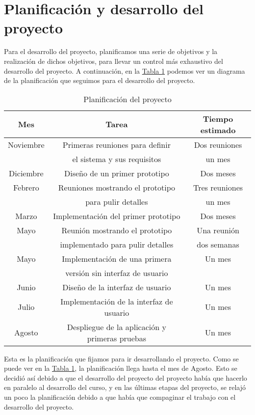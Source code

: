 \section{Planificación y desarrollo del proyecto}

Para el desarrollo del proyecto, planificamos una serie de objetivos y la realización de dichos objetivos, para llevar un control más exhaustivo del desarrollo del proyecto. A continuación, en la \hyperref[desarrollo]{Tabla \ref*{desarrollo}} podemos ver un diagrama de la planificación que seguimos para el desarrollo del proyecto.
\begin{table}[H]
\begin{center}
\begin{tabular}{c | c | c}
\textbf{Mes} & \textbf{Tarea} & \textbf{Tiempo estimado} \\
\hline
Noviembre & Primeras reuniones para definir & Dos reuniones \\
& el sistema y sus requisitos &  un mes \\
Diciembre & Diseño de un primer prototipo & Dos meses \\
Febrero & Reuniones mostrando el prototipo  & Tres reuniones\\
& para pulir detalles & un mes \\
Marzo & Implementación del primer prototipo & Dos meses \\
Mayo & Reunión mostrando el prototipo  & Una reunión \\
& implementado para pulir detalles & dos semanas \\
Mayo & Implementación de una primera & Un mes \\
& versión sin interfaz de usuario & \\
Junio & Diseño de la interfaz de usuario & Un mes \\
Julio & Implementación de la interfaz de usuario & Un mes \\
Agosto & Despliegue de la aplicación y primeras pruebas & Un mes \\
\end{tabular}
\end{center}
\caption{Planificación del proyecto}
\label{desarrollo}
\end{table}

Esta es la planificación que fijamos para ir desarrollando el proyecto. Como se puede ver en la \hyperref[desarrollo]{Tabla \ref*{desarrollo}}, la planificación llega hasta el mes de Agosto. Esto se decidió así debido a que el desarrollo del proyecto del proyecto había que hacerlo en paralelo al desarrollo del curso, y en las últimas etapas del proyecto, se relajó un poco la planificación debido a que había que compaginar el trabajo con el desarrollo del proyecto.

